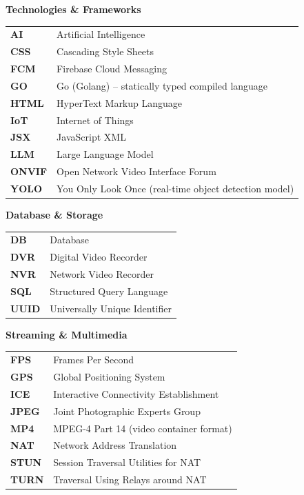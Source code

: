 \documentclass[12pt,a4paper,oneside]{report}
\begin{document}
\vspace{12pt}
\textbf{Technologies \& Frameworks}\\[4pt]
\begin{tabular}{@{}p{3cm}l@{}}
\textbf{AI}      & Artificial Intelligence \\
\textbf{CSS}     & Cascading Style Sheets \\
\textbf{FCM}     & Firebase Cloud Messaging \\
\textbf{GO}      & Go (Golang) -- statically typed compiled language \\
\textbf{HTML}    & HyperText Markup Language \\
\textbf{IoT}     & Internet of Things \\
\textbf{JSX}     & JavaScript XML \\
\textbf{LLM}     & Large Language Model \\
\textbf{ONVIF}   & Open Network Video Interface Forum \\
\textbf{YOLO}    & You Only Look Once (real-time object detection model) \\
\end{tabular}

\vspace{12pt}
\textbf{Database \& Storage}\\[4pt]
\begin{tabular}{@{}p{3cm}l@{}}
\textbf{DB}      & Database \\
\textbf{DVR}     & Digital Video Recorder \\
\textbf{NVR}     & Network Video Recorder \\
\textbf{SQL}     & Structured Query Language \\
\textbf{UUID}    & Universally Unique Identifier \\
\end{tabular}

\vspace{12pt}
\textbf{Streaming \& Multimedia}\\[4pt]
\begin{tabular}{@{}p{3cm}l@{}}
\textbf{FPS}     & Frames Per Second \\
\textbf{GPS}     & Global Positioning System \\
\textbf{ICE}     & Interactive Connectivity Establishment \\
\textbf{JPEG}    & Joint Photographic Experts Group \\
\textbf{MP4}     & MPEG-4 Part 14 (video container format) \\
\textbf{NAT}     & Network Address Translation \\
\textbf{STUN}    & Session Traversal Utilities for NAT \\
\textbf{TURN}    & Traversal Using Relays around NAT \\
\end{tabular}
\end{document}

